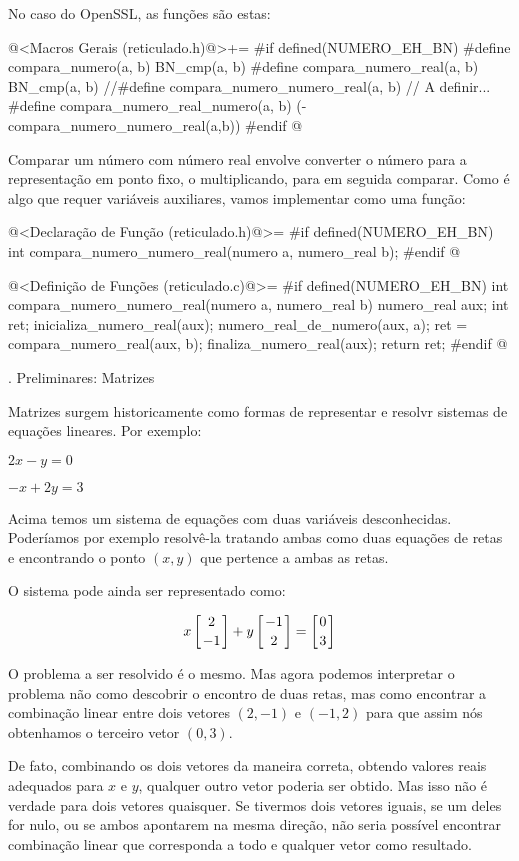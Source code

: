 No caso do OpenSSL, as funções são estas:

\iniciocodigo
@<Macros Gerais (reticulado.h)@>+=
#if defined(NUMERO_EH_BN)
#define compara_numero(a, b) BN_cmp(a, b)
#define compara_numero_real(a, b) BN_cmp(a, b)
//#define compara_numero_numero_real(a, b) // A definir...
#define compara_numero_real_numero(a, b) (-compara_numero_numero_real(a,b))
#endif
@
\fimcodigo

Comparar um número com número real envolve converter o número para a
representação em ponto fixo, o multiplicando, para em seguida
comparar. Como é algo que requer variáveis auxiliares, vamos
implementar como uma função:

\iniciocodigo
@<Declaração de Função (reticulado.h)@>=
#if defined(NUMERO_EH_BN)
int compara_numero_numero_real(numero a, numero_real b);
#endif
@
\fimcodigo

\iniciocodigo
@<Definição de Funções (reticulado.c)@>=
#if defined(NUMERO_EH_BN)
int compara_numero_numero_real(numero a, numero_real b){
  numero_real aux;
  int ret;
  inicializa_numero_real(aux);
  numero_real_de_numero(aux, a);
  ret = compara_numero_real(aux, b);
  finaliza_numero_real(aux);
  return ret;
}
#endif
@





{\twelvebold {}. Preliminares: Matrizes}

Matrizes surgem historicamente como formas de representar e resolvr
sistemas de equações lineares. Por exemplo:

$2x-y=0$

$-x+2y=3$

Acima temos um sistema de equações com duas variáveis
desconhecidas. Poderíamos por exemplo resolvê-la tratando ambas como
duas equações de retas e encontrando o ponto $(x, y)$ que pertence a
ambas as retas.

O sistema pode ainda ser representado como:

$$x\left[{2\atop-1}\right]+y\left[-1\atop 2\right]=\left[0\atop3\right]$$

O problema a ser resolvido é o mesmo. Mas agora podemos interpretar o
problema não como descobrir o encontro de duas retas, mas como
encontrar a combinação linear entre dois vetores $(2, -1)$ e $(-1, 2)$
para que assim nós obtenhamos o terceiro vetor $(0, 3)$.

De fato, combinando os dois vetores da maneira correta, obtendo
valores reais adequados para $x$ e $y$, qualquer outro vetor poderia
ser obtido. Mas isso não é verdade para dois vetores quaisquer. Se
tivermos dois vetores iguais, se um deles for nulo, ou se ambos
apontarem na mesma direção, não seria possível encontrar combinação
linear que corresponda a todo e qualquer vetor como resultado.

